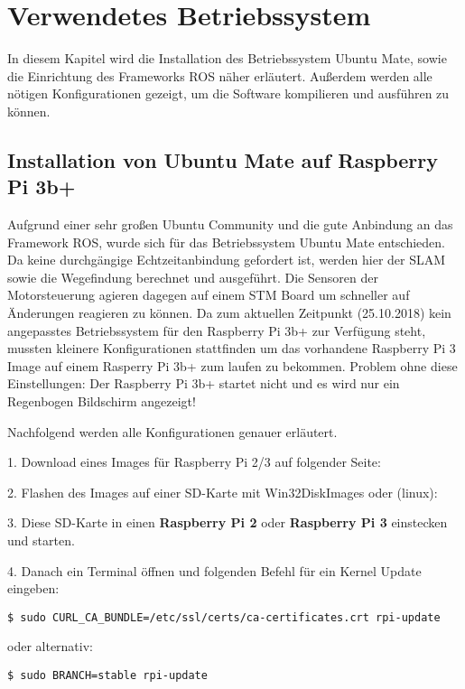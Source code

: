 \chapter{Verwendetes Betriebssystem}
In diesem Kapitel wird die Installation des Betriebssystem Ubuntu Mate, sowie die Einrichtung des Frameworks ROS näher erläutert. Außerdem werden alle nötigen Konfigurationen gezeigt, um die Software kompilieren und ausführen zu können. 


\section{Installation von Ubuntu Mate auf Raspberry Pi 3b+}
Aufgrund einer sehr großen Ubuntu Community und die gute Anbindung an das Framework ROS, wurde sich für das Betriebssystem Ubuntu Mate entschieden. Da keine durchgängige Echtzeitanbindung gefordert ist, werden hier der SLAM sowie die Wegefindung berechnet und ausgeführt. Die Sensoren der Motorsteuerung agieren dagegen auf einem STM Board um schneller auf Änderungen reagieren zu können. 
Da zum aktuellen Zeitpunkt (25.10.2018) kein angepasstes Betriebssystem für den Raspberry Pi 3b+ zur Verfügung steht, mussten kleinere Konfigurationen stattfinden um das vorhandene Raspberry Pi 3 Image auf einem Rasperry Pi 3b+ zum laufen zu bekommen. 
Problem ohne diese Einstellungen: Der Raspberry Pi 3b+ startet nicht und es wird nur ein Regenbogen Bildschirm angezeigt!

Nachfolgend werden alle Konfigurationen genauer erläutert. 

1. Download eines Images für Raspberry  Pi 2/3 auf folgender Seite:

2. Flashen des Images auf einer SD-Karte mit Win32DiskImages oder (linux):

3. Diese SD-Karte in einen \textbf{Raspberry Pi 2} oder \textbf{Raspberry Pi 3} einstecken und starten. 

4. Danach ein Terminal öffnen und folgenden Befehl für ein Kernel Update eingeben:\\

\begin{lstlisting}
$ sudo CURL_CA_BUNDLE=/etc/ssl/certs/ca-certificates.crt rpi-update
\end{lstlisting}

oder alternativ:\\

\begin{lstlisting}
$ sudo BRANCH=stable rpi-update
\end{lstlisting}


